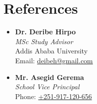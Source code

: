 \documentclass[11pt]{article}
\begin{document}
\section{References}

\begin{itemize}[leftmargin=1.5em, itemsep=0.5em]
    \item \textbf{Dr. Deribe Hirpo} \\
           \textit{MSc Study Advisor} \\
           Addis Ababa University \\
           Email: \href{mailto:deibeh@gmail.com}{deibeh@gmail.com}
    
    \item \textbf{Mr. Asegid Gerema} \\
           \textit{School Vice Principal} \\
           Phone: \href{tel:+251917120656}{+251-917-120-656}
\end{itemize}
\end{document}
